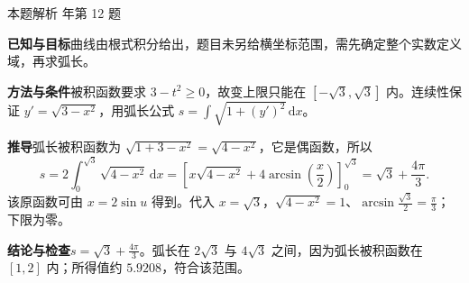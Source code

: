 \documentclass[UTF8,zihao=-4,fontset=fandol]{ctexart}
\newenvironment{QuestionSolution}[1]{%
  \clearpage
  {\small\textcolor{black!60}{本题解析\quad #1}}\par\medskip
}{\par\clearpage}
\begin{document}
\begin{QuestionSolution}{2023 年第 12 题}
\textbf{已知与目标}\quad 曲线由根式积分给出，题目未另给横坐标范围，需先确定整个实数定义域，再求弧长。

\textbf{方法与条件}\quad 被积函数要求 \(3-t^2\ge0\)，故变上限只能在 \([-\sqrt3,\sqrt3]\) 内。连续性保证 \(y'=\sqrt{3-x^2}\)，用弧长公式 \(s=\int\sqrt{1+(y')^2}\,\mathrm{d}x\)。

\textbf{推导}\quad 弧长被积函数为 \(\sqrt{1+3-x^2}=\sqrt{4-x^2}\)，它是偶函数，所以
\[
s=2\int_0^{\sqrt3}\sqrt{4-x^2}\,\mathrm{d}x
=\left[x\sqrt{4-x^2}+4\arcsin(\frac{x}{2})\right]_0^{\sqrt3}
=\boxed{\sqrt3+\frac{4\pi}{3}} .
\]
该原函数可由 \(x=2\sin u\) 得到。代入 \(x=\sqrt3\)，\(\sqrt{4-x^2}=1\)、\(\arcsin\frac{\sqrt3}{2}=\frac{\pi}{3}\)；下限为零。

\textbf{结论与检查}\quad \(\boxed{s=\sqrt3+\frac{4\pi}{3}}\)。弧长在 \(2\sqrt3\) 与 \(4\sqrt3\) 之间，因为弧长被积函数在 \([1,2]\) 内；所得值约 \(5.9208\)，符合该范围。
\end{QuestionSolution}
\end{document}
